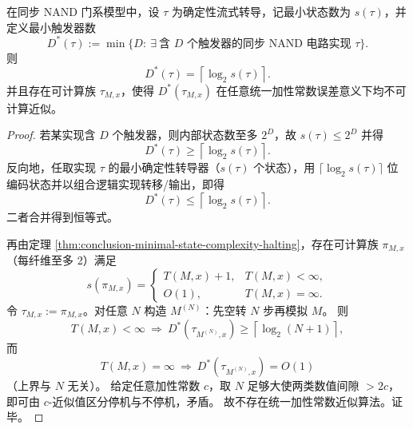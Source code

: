\begin{theorem}[同步逻辑门模型的最小触发器数与强不可计算性]\label{thm:conclusion-minimal-flipflop-count-strong-uncomputability}
在同步 NAND 门系模型中，设 \(\tau\) 为确定性流式转导，记最小状态数为 \(s(\tau)\)，并定义最小触发器数
\[
D^\ast(\tau):=\min\{D:\ \exists\ \text{含 }D\text{ 个触发器的同步 NAND 电路实现 }\tau\}.
\]
则
\[
D^\ast(\tau)=\left\lceil\log_2 s(\tau)\right\rceil.
\]
并且存在可计算族 \(\tau_{M,x}\)，使得 \(D^\ast(\tau_{M,x})\) 在任意统一加性常数误差意义下均不可计算近似。
\end{theorem}
\begin{proof}
若某实现含 \(D\) 个触发器，则内部状态数至多 \(2^D\)，故 \(s(\tau)\le 2^D\) 并得
\[
D^\ast(\tau)\ge \left\lceil\log_2 s(\tau)\right\rceil.
\]
反向地，任取实现 \(\tau\) 的最小确定性转导器（\(s(\tau)\) 个状态），用 \(\lceil\log_2 s(\tau)\rceil\) 位编码状态并以组合逻辑实现转移/输出，即得
\[
D^\ast(\tau)\le \left\lceil\log_2 s(\tau)\right\rceil.
\]
二者合并得到恒等式。

再由定理 \ref{thm:conclusion-minimal-state-complexity-halting}，存在可计算族 \(\pi_{M,x}\)（每纤维至多 2）满足
\[
s(\pi_{M,x})=
\begin{cases}
T(M,x)+1,&T(M,x)<\infty,\\
O(1),&T(M,x)=\infty.
\end{cases}
\]
令 \(\tau_{M,x}:=\pi_{M,x}\)。对任意 \(N\) 构造 \(M^{(N)}\)：先空转 \(N\) 步再模拟 \(M\)。
则
\[
T(M,x)<\infty\ \Longrightarrow\ D^\ast(\tau_{M^{(N)},x})\ge \left\lceil\log_2(N+1)\right\rceil,
\]
而
\[
T(M,x)=\infty\ \Longrightarrow\ D^\ast(\tau_{M^{(N)},x})=O(1)
\]
（上界与 \(N\) 无关）。
给定任意加性常数 \(c\)，取 \(N\) 足够大使两类数值间隙 \(>2c\)，即可由 \(c\)-近似值区分停机与不停机，矛盾。
故不存在统一加性常数近似算法。证毕。
\end{proof}

